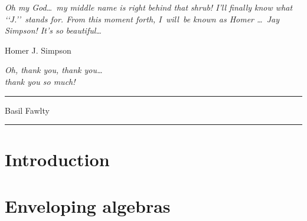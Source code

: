 \documentclass{book}
\begin{document}
\pagestyle{plain}
\renewcommand{\thepage}{\roman{page}}


\thispagestyle{empty}

\vspace*{\fill}
\hfill
\hspace{5mm}
\begin{minipage}[b]{7cm}
\sf \textsl{Oh my God\ldots\ my middle name is right behind that shrub!
I'll finally know what \lq\lq J.\rq\rq\ stands for.  From this moment
forth, \mbox{I will}\ be known as Homer \ldots\ Jay Simpson!
It's so beautiful\ldots}
\vspace{2ex}

\hfill Homer J. Simpson
\end{minipage}


\newpage
\thispagestyle{empty}

\hfill
\begin{minipage}[t]{5cm} \flushright
\sf
\textsl{Oh, thank you, thank you\ldots\\ thank you so much!}

\rule{3.5cm}{0.5pt}
\vspace{3pt}

Basil Fawlty
\end{minipage}


\vspace{\fill}

\hfill \rule{0.5pt}{12.8cm}
\hspace{5mm}
\begin{minipage}[b]{10.5cm}
\sf

\end{minipage}



\tableofcontents

\chapter{Introduction}
\renewcommand{\thepage}{\arabic{page}}
\setcounter{page}{1}





\chapter{Enveloping algebras}
\label{chapter:Enveloping_algebras}









\end{document}
